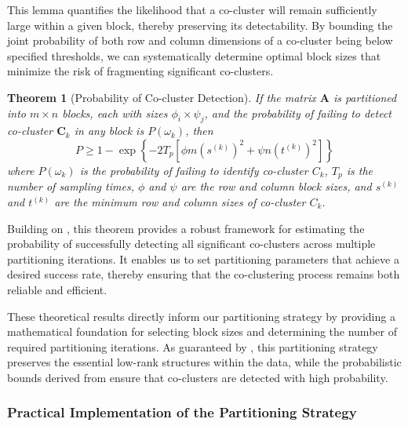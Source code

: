 \documentclass[journal]{IEEEtran}
\newtheorem{theorem}{Theorem}
\begin{document}
This lemma quantifies the likelihood that a co-cluster will remain sufficiently large within a given block, thereby preserving its detectability. By bounding the joint probability of both row and column dimensions of a co-cluster being below specified thresholds, we can systematically determine optimal block sizes that minimize the risk of fragmenting significant co-clusters.

\begin{theorem}[Probability of Co-cluster Detection]
    \label{thm:probability_co_cluster_detection}
    If the matrix $\mathbf{A}$ is partitioned into $m \times n$ blocks, each with sizes $\phi_i \times \psi_j$, and the probability of failing to detect co-cluster $\mathbf{C}_k$ in any block is $P(\omega_k)$, then
    \begin{equation}
        P \geq 1 - \exp \left\{ -2 T_p \left[ \phi m (s^{(k)})^2 + \psi n (t^{(k)})^2 \right] \right\}
    \end{equation}
    where $P(\omega_k)$ is the probability of failing to identify co-cluster $C_k$, $T_p$ is the number of sampling times, $\phi$ and $\psi$ are the row and column block sizes, and $s^{(k)}$ and $t^{(k)}$ are the minimum row and column sizes of co-cluster $C_k$.
\end{theorem}

Building on , this theorem provides a robust framework for estimating the probability of successfully detecting all significant co-clusters across multiple partitioning iterations. It enables us to set partitioning parameters that achieve a desired success rate, thereby ensuring that the co-clustering process remains both reliable and efficient.

These theoretical results directly inform our partitioning strategy by providing a mathematical foundation for selecting block sizes and determining the number of required partitioning iterations. As guaranteed by , this partitioning strategy preserves the essential low-rank structures within the data, while the probabilistic bounds derived from  ensure that co-clusters are detected with high probability.

\subsubsection{Practical Implementation of the Partitioning Strategy}
\label{subsec:practical_implementation}
\end{document}
